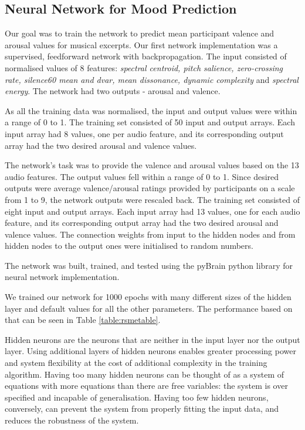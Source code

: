 \vspace{10pt}

\subsection{Neural Network for Mood Prediction}

Our goal was to train the network to predict mean participant valence and arousal values for musical excerpts. 
Our first network implementation was a supervised, feedforward network with backpropagation. 
The input consisted of normalised values of 8 features:
\textit{spectral centroid, pitch salience, zero-crossing rate, silence60 mean  and dvar, mean dissonance, dynamic complexity} and \textit{spectral energy}. 
The network had two outputs - arousal and valence.

As all the training data was normalised, the input and output values were within a range of 0 to 1. The training set consisted of 50 input and output arrays. Each input array had 8 values, one per audio feature, and its corresponding output array had the two desired arousal and valence values.

The network’s task was to provide the valence and arousal values based on the 13 audio features. The output values fell within a range of 0 to 1. Since desired outputs were average valence/arousal ratings provided by participants on a scale from 1 to 9, the network outputs were rescaled back. The training set consisted of eight input and output arrays. Each input array had 13 values, one for each audio feature, and its corresponding output array had the two desired arousal and valence values. The connection weights from input to the hidden nodes and from hidden nodes to the output ones were initialised to random numbers. 

The network was built, trained, and tested using the pyBrain python library for neural network implementation. 

We trained our network for 1000 epochs with many different sizes of the hidden layer and default values for all the other parameters. The performance based on that can be seen in Table \ref{table:rsmetable}.


Hidden neurons are the neurons that are neither in the input layer nor the output layer. Using additional layers of hidden neurons enables greater processing power and system flexibility at the cost of additional complexity in the training algorithm. Having too many hidden neurons can be thought of as a system of equations with more equations than there are free variables: the system is over specified and incapable of generalisation. Having too few hidden neurons, conversely, can prevent the system from properly fitting the input data, and reduces the robustness of the system.

